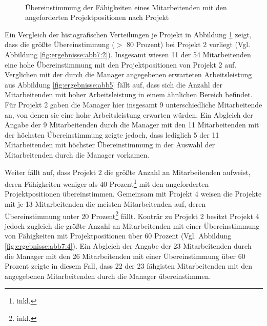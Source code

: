 \begin{figure}
    \\
\caption[Übereinstimmung der der Fähigkeiten eines Mitarbeitenden mit den angeforderten Projektpositionen nach Projekt]{Übereinstimmung der Fähigkeiten eines Mitarbeitenden mit den angeforderten Projektpositionen nach Projekt}
  \label{fig:ergebnisse:abb7}
\end{figure}

Ein Vergleich der histografischen Verteilungen je Projekt in Abbildung \ref{fig:ergebnisse:abb7} zeigt, dass die größte Übereinstimmung ($>$ 80 Prozent) bei Projekt 2 vorliegt (Vgl. Abbildung \ref{fig:ergebnisse:abb7:2}).
Insgesamt wiesen 11 der 54 Mitarbeitenden eine hohe Übereinstimmung mit den Projektpositionen von Projekt 2 auf.
Verglichen mit der durch die Manager angegebenen erwarteten Arbeitsleistung aus Abbildung \ref{fig:ergebnisse:abb5} fällt auf, dass sich die Anzahl der Mitarbeitenden mit hoher Arbeitsleistung in einem ähnlichen Bereich befindet.
Für Projekt 2 gaben die Manager hier insgesamt 9 unterschiedliche Mitarbeitende an, von denen sie eine hohe Arbeitsleistung erwarten würden.
Ein Abgleich der Angabe der 9 Mitarbeitenden durch die Manager mit den 11 Mitarbeitenden mit der höchsten Übereinstimmung zeigte jedoch, dass lediglich 5 der 11 Mitarbeitenden mit höchster Übereinstimmung in der Auswahl der Mitarbeitenden durch die Manager vorkamen.

Weiter fällt auf, dass Projekt 2 die größte Anzahl an Mitarbeitenden aufweist, deren Fähigkeiten weniger als 40 Prozent\footnote{inkl.} mit den angeforderten Projektpositionen übereinstimmen.
Gemeinsam mit Projekt 4 weisen die Projekte mit je 13 Mitarbeitenden die meisten Mitarbeitenden auf, deren Übereinstimmung unter 20 Prozent\footnote{inkl.} fällt.
Konträr zu Projekt 2 besitzt Projekt 4 jedoch zugleich die größte Anzahl an Mitarbeitenden mit einer Übereinstimmung von Fähigkeiten mit Projektpositionen über 60 Prozent (Vgl. Abbildung \ref{fig:ergebnisse:abb7:4}).
Ein Abgleich der Angabe der 23 Mitarbeitenden durch die Manager mit den 26 Mitarbeitenden mit einer Übereinstimmung über 60 Prozent zeigte in diesem Fall, dass 22 der 23 fähgisten Mitarbeitenden mit den angegebenen Mitarbeitenden durch die Manager übereinstimmen.

